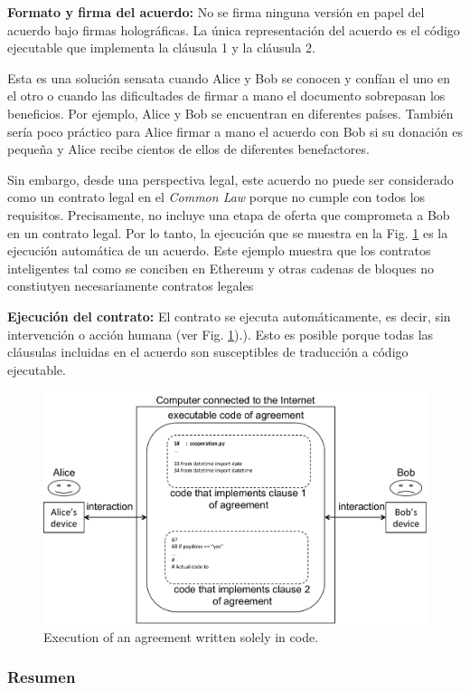 \documentclass[12pt]{report} %
\begin{document}
\textbf{Formato y firma del acuerdo:} No se firma ninguna versión en papel del acuerdo bajo firmas holográficas. La única representación del acuerdo es el código ejecutable que implementa la cláusula 1 y la cláusula 2.

Esta es una solución sensata cuando Alice y Bob se conocen y confían el uno en el otro o cuando las dificultades de firmar a mano el documento sobrepasan los beneficios. Por ejemplo, Alice y Bob se encuentran en diferentes países. También sería poco práctico para Alice firmar a mano el acuerdo con Bob si su donación es pequeña y Alice recibe cientos de ellos de diferentes benefactores.

Sin embargo, desde una perspectiva legal, este acuerdo no puede ser considerado como un contrato legal en el \textit{Common Law} porque no cumple con todos los requisitos. Precisamente, no incluye una etapa de oferta que comprometa a Bob en un contrato legal. Por lo tanto, la ejecución que se muestra en la Fig. \ref{fig:exeagreesolecode}  es la ejecución automática de un acuerdo. Este ejemplo muestra que los contratos inteligentes tal como se conciben en Ethereum y otras cadenas de bloques no constiutyen necesariamente contratos legales

\textbf{Ejecución del contrato:} El contrato se ejecuta automáticamente, es decir, sin intervención o acción humana (ver Fig. \ref{fig:exeagreesolecode}).). Esto es posible porque todas las cláusulas incluidas en el acuerdo son susceptibles de traducción a código ejecutable.


\begin{figure}
\centering
\includegraphics[width=0.80\columnwidth]{figures/exeagreesolecode.pdf}
\caption{Execution of an agreement written solely in code.}
\label{fig:exeagreesolecode}
\end{figure}


\subsubsection{Resumen}
\end{document}
